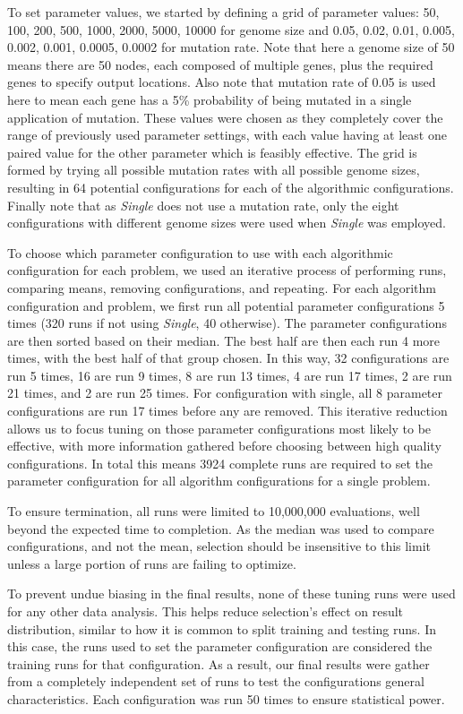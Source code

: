 \documentclass[journal]{IEEEtran}
\begin{document}
To set parameter values, we started by defining a grid of parameter values:
50, 100, 200, 500, 1000, 2000, 5000, 10000 for genome size and 0.05, 0.02, 0.01,
0.005, 0.002, 0.001, 0.0005, 0.0002 for mutation rate.  Note that here a genome
size of 50 means there are 50 nodes, each composed of multiple genes, plus the
required genes to specify output locations.  Also note that mutation rate of 0.05
is used here to mean each gene has a 5\% probability of being mutated in a single
application of mutation.  These values were chosen as they completely cover the
range of previously used parameter settings, with each value having at least
one paired value for the other parameter which is feasibly effective.
The grid is formed by trying all possible mutation rates
with all possible genome sizes, resulting in 64 potential configurations for each
of the algorithmic configurations.  Finally note that as \emph{Single} does not
use a mutation rate, only the eight configurations with different genome sizes were
used when \emph{Single} was employed.

To choose which parameter configuration to use with each algorithmic configuration
for each problem, we used an iterative process of performing runs, comparing means, removing configurations,
and repeating.  For each algorithm configuration and problem, we first run all
potential parameter configurations 5 times (320 runs if not using \emph{Single}, 40 otherwise).
The parameter configurations are then sorted based on their median.  The best half are then
each run 4 more times, with the best half of that group chosen.  In this way, 32 configurations
are run 5 times, 16 are run 9 times, 8 are run 13 times, 4 are run 17 times, 2 are run 21 times,
and 2 are run 25 times.  For configuration with single, all 8 parameter configurations are run 17 times
before any are removed.  This iterative reduction allows us to focus tuning on
those parameter configurations most likely to be effective, with more information
gathered before choosing between high quality configurations.  In total this means
3924 complete runs are required to set the parameter configuration for all
algorithm configurations for a single problem.

To ensure termination, all runs were limited to 10,000,000 evaluations, well beyond
the expected time to completion.  As the median was used to compare configurations,
and not the mean, selection should be insensitive to this limit unless a large
portion of runs are failing to optimize.

To prevent undue biasing in the final results, none of these tuning runs were
used for any other data analysis.  This helps reduce selection's effect on
result distribution, similar to how it is common to split training and testing
runs.  In this case, the runs used to set the parameter configuration are considered
the training runs for that configuration.  As a result, our final results were gather
from a completely independent set of runs to test the configurations general characteristics.
Each configuration was run 50 times to ensure statistical power.
\end{document}
